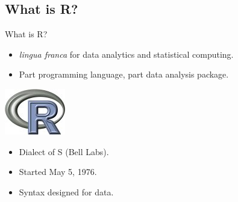 \subsection{What is R?}
\makesubcontentsslidessec


\begin{frame}
  \begin{block}{What is R?}\pause
  \begin{minipage}{.75\textwidth}
  \begin{itemize}[<+-|alert@+>]
    \item \emph{lingua franca} for data analytics and statistical computing.
    \item Part programming language, part data analysis package.
  \end{itemize}
  \end{minipage}
  \hfill
  \begin{minipage}{.2\textwidth}
    \centering\includegraphics[scale=2]{../common/pics/Rlogo}
  \end{minipage}
  \begin{itemize}
    \item Dialect of S (Bell Labs).
    \item Started May 5, 1976.
    \item Syntax designed for data.
  \end{itemize}
\end{block}
\end{frame}



